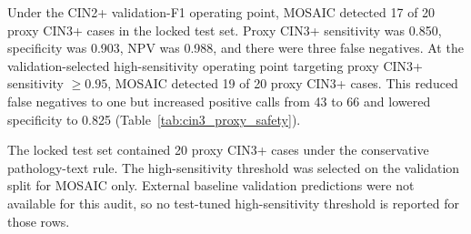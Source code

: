 \documentclass[11pt, a4paper]{article}
\theoremstyle{plain}
\theoremstyle{definition}
\begin{document}
Under the CIN2+ validation-F1 operating point, MOSAIC detected 17 of 20 proxy CIN3+ cases in the locked test set. Proxy CIN3+ sensitivity was 0.850, specificity was 0.903, NPV was 0.988, and there were three false negatives. At the validation-selected high-sensitivity operating point targeting proxy CIN3+ sensitivity \(\geq 0.95\), MOSAIC detected 19 of 20 proxy CIN3+ cases. This reduced false negatives to one but increased positive calls from 43 to 66 and lowered specificity to 0.825 (Table~\ref{tab:cin3_proxy_safety}).

\begin{table}[!htbp]
  \centering
  \caption{CIN3+ proxy safety-oriented threshold audit on the locked test set.}
  \label{tab:cin3_proxy_safety}
  \scriptsize
  \begin{threeparttable}
  \begin{tablenotes}[flushleft]
    \footnotesize
    \item The locked test set contained 20 proxy CIN3+ cases under the conservative pathology-text rule. The high-sensitivity threshold was selected on the validation split for MOSAIC only. External baseline validation predictions were not available for this audit, so no test-tuned high-sensitivity threshold is reported for those rows.
  \end{tablenotes}
  \end{threeparttable}
\end{table}
\end{document}
